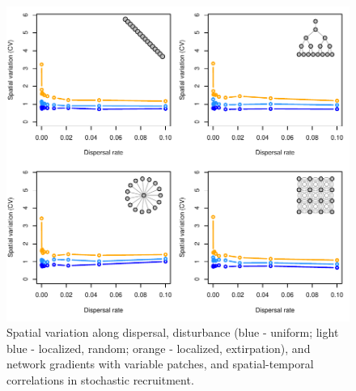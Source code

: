 \documentclass[]{article}
\begin{document}
\begin{figure}[H]

{\centering \includegraphics{Managing_for_ecological_surprises_in_metapopulations_makeHTML_files/figure-latex/CV with variable patches and space-time stochasticity-1} 

}

\caption{Spatial variation along dispersal, disturbance (blue - uniform; light blue - localized, random; orange - localized, extirpation), and network gradients with variable patches, and spatial-temporal correlations in stochastic recruitment.}\label{fig:CV with variable patches and space-time stochasticity}
\end{figure}
\end{document}
